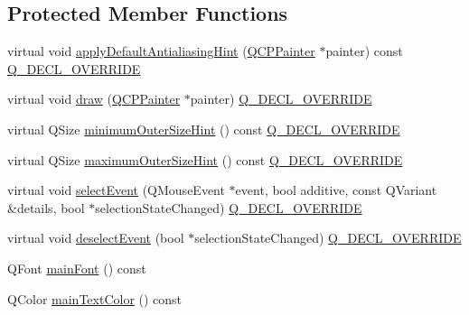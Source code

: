 \subsection*{Protected Member Functions}
\begin{DoxyCompactItemize}
\item 
virtual void \mbox{\hyperlink{class_q_c_p_text_element_a91f2e4b4a639d9079e89a0030c7ed352}{apply\+Default\+Antialiasing\+Hint}} (\mbox{\hyperlink{class_q_c_p_painter}{Q\+C\+P\+Painter}} $\ast$painter) const \mbox{\hyperlink{qcustomplot_8h_a42cc5eaeb25b85f8b52d2a4b94c56f55}{Q\+\_\+\+D\+E\+C\+L\+\_\+\+O\+V\+E\+R\+R\+I\+DE}}
\item 
virtual void \mbox{\hyperlink{class_q_c_p_text_element_ad1dae61ea77ae74841f3c2fb765fc88e}{draw}} (\mbox{\hyperlink{class_q_c_p_painter}{Q\+C\+P\+Painter}} $\ast$painter) \mbox{\hyperlink{qcustomplot_8h_a42cc5eaeb25b85f8b52d2a4b94c56f55}{Q\+\_\+\+D\+E\+C\+L\+\_\+\+O\+V\+E\+R\+R\+I\+DE}}
\item 
virtual Q\+Size \mbox{\hyperlink{class_q_c_p_text_element_a47b8541f55ff520c557e0f27461f109e}{minimum\+Outer\+Size\+Hint}} () const \mbox{\hyperlink{qcustomplot_8h_a42cc5eaeb25b85f8b52d2a4b94c56f55}{Q\+\_\+\+D\+E\+C\+L\+\_\+\+O\+V\+E\+R\+R\+I\+DE}}
\item 
virtual Q\+Size \mbox{\hyperlink{class_q_c_p_text_element_ae82475b50c10a5b3314d996d50ae536b}{maximum\+Outer\+Size\+Hint}} () const \mbox{\hyperlink{qcustomplot_8h_a42cc5eaeb25b85f8b52d2a4b94c56f55}{Q\+\_\+\+D\+E\+C\+L\+\_\+\+O\+V\+E\+R\+R\+I\+DE}}
\item 
virtual void \mbox{\hyperlink{class_q_c_p_text_element_a8d696ea82fa7bf743e01858039c03525}{select\+Event}} (Q\+Mouse\+Event $\ast$event, bool additive, const Q\+Variant \&details, bool $\ast$selection\+State\+Changed) \mbox{\hyperlink{qcustomplot_8h_a42cc5eaeb25b85f8b52d2a4b94c56f55}{Q\+\_\+\+D\+E\+C\+L\+\_\+\+O\+V\+E\+R\+R\+I\+DE}}
\item 
virtual void \mbox{\hyperlink{class_q_c_p_text_element_a9a631a9deb9d82089a9d52de1744accf}{deselect\+Event}} (bool $\ast$selection\+State\+Changed) \mbox{\hyperlink{qcustomplot_8h_a42cc5eaeb25b85f8b52d2a4b94c56f55}{Q\+\_\+\+D\+E\+C\+L\+\_\+\+O\+V\+E\+R\+R\+I\+DE}}
\item 
Q\+Font \mbox{\hyperlink{class_q_c_p_text_element_ae236bd398e52939f2de2b70e5e2ba611}{main\+Font}} () const
\item 
Q\+Color \mbox{\hyperlink{class_q_c_p_text_element_a63510789e31db34362de97d78e9e7866}{main\+Text\+Color}} () const
\end{DoxyCompactItemize}
